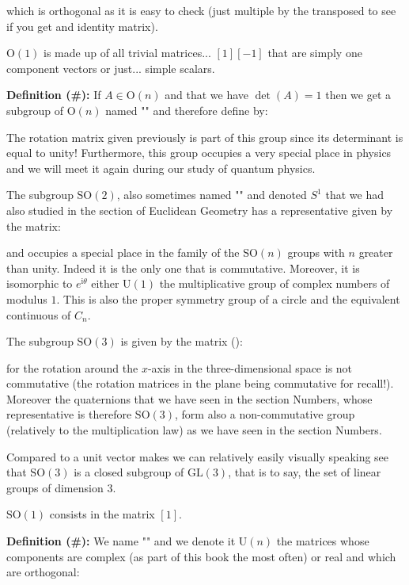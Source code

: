 	which is orthogonal as it is easy to check (just multiple by the transposed to see if you get and identity matrix).
	\begin{tcolorbox}[title=Remark,colframe=black,arc=10pt]
	$\text{O}(1)$ is  made up of all trivial matrices... $[1] [-1]$ that are simply one component vectors or just... simple scalars.
	\end{tcolorbox}
	\textbf{Definition (\#\mydef):} If $A\in \text{O}(n)$ and that we have $\det(A)=1$ then we get a subgroup of $\text{O}(n)$ named "\label{special real group orthogonal}" and therefore define by:
	
	The rotation matrix given previously is part of this group since its determinant is equal to unity! Furthermore, this group occupies a very special place in physics and we will meet it again during our study of quantum physics.
	
	The subgroup $\text{SO}(2)$, also sometimes named "" and denoted $S^1$ that we had also studied in the section of Euclidean Geometry has a representative given by the matrix:
	
	and occupies a special place in the family of the $\text{SO}(n)$ groups  with $n$ greater than unity. Indeed it is the only one that is commutative. Moreover, it is isomorphic to $e^{\mathrm{i}\theta}$ either $\text{U}(1)$ the multiplicative group of complex numbers of modulus $1$. This is also the proper symmetry group of a circle and the equivalent continuous of $C_n$.
	
	The subgroup $\text{SO}(3)$ is given by the matrix ():
	
	for the rotation around the $x$-axis in the three-dimensional space is not commutative (the rotation matrices in the plane being commutative for recall!). Moreover the quaternions that we have seen in the section Numbers, whose representative is therefore $\text{SO}(3)$, form also a non-commutative group (relatively to the multiplication law) as we have seen in the section Numbers.
	
	Compared to a unit vector makes we can relatively easily visually speaking see that $\text{SO} (3)$ is a closed subgroup of $\text{GL} (3)$, that is to say, the set of linear groups of dimension $3$.
	
	\begin{tcolorbox}[title=Remark,colframe=black,arc=10pt]
	$\text{SO} (1)$ consists in the matrix $[1]$.
	\end{tcolorbox}	
	\textbf{Definition (\#\mydef):} We name "\label{unitary linear group}" and we denote it $\text{U}(n)$ the matrices whose components are complex (as part of this book the most often) or real and which are orthogonal:
	
